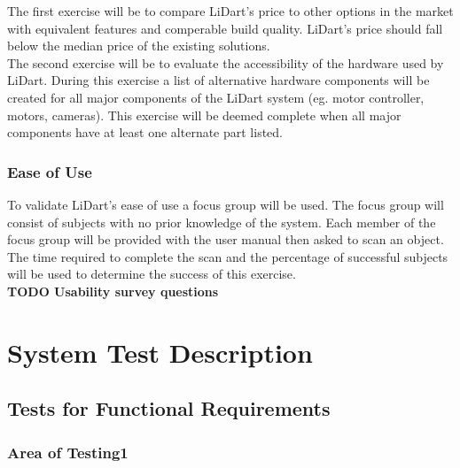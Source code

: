 \documentclass[12pt, titlepage]{article}
\begin{document}
\noindent The first exercise will be to compare LiDart's price to other options in the market with equivalent features
and comperable build quality. LiDart's price should fall below the median price of the existing solutions.
\ \\

\noindent The second exercise will be to evaluate the accessibility of the hardware used by LiDart. During
this exercise a list of alternative hardware components will be created for all major components of the LiDart
system (eg. motor controller, motors, cameras). This exercise will be deemed complete when all major components
have at least one alternate part listed.

\subsubsection{Ease of Use}

To validate LiDart's ease of use a focus group will be used. The focus group will consist of
subjects with no prior knowledge of the system. Each member of the focus group will be provided
with the user manual then asked to scan an object. The time required to complete the scan and the 
percentage of successful subjects will be used to determine the success of this exercise.
\ \\

\noindent \bf{TODO Usability survey questions}

\section{System Test Description} \label{SysTests}
	
\subsection{Tests for Functional Requirements}



\subsubsection{Area of Testing1}
\end{document}
